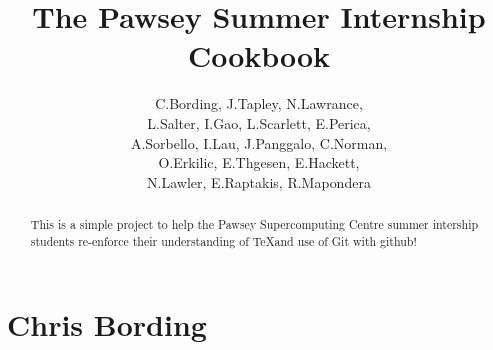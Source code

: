 \documentclass[11pt,a4paper]{report}
\title{The Pawsey Summer Internship Cookbook}
\author{C.Bording, J.Tapley, N.Lawrance,\\
L.Salter, I.Gao, L.Scarlett, E.Perica,\\
A.Sorbello, I.Lau, J.Panggalo, C.Norman,\\
O.Erkilic, E.Thgesen, E.Hackett,\\
N.Lawler, E.Raptakis, R.Mapondera}
\begin{document}
\maketitle
\tableofcontents


\begin{abstract}

This is a simple project to help the Pawsey Supercomputing Centre summer intership students re-enforce their understanding of \TeX and use of Git with github!

\end{abstract}

\chapter{Chris Bording}

\end{document}
